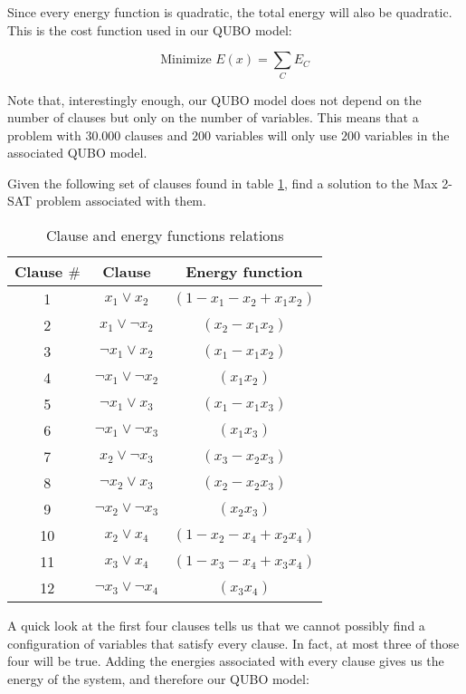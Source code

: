 Since every energy function is quadratic, the total energy will also be quadratic. This is the cost function used in our QUBO model:

$$ \text{Minimize } E(x) = \sum_C E_C$$

Note that, interestingly enough, our QUBO model does not depend on the number of clauses but only on the number of variables. This means that a problem with $30.000$ clauses and $200$ variables will only use $200$ variables in the associated QUBO model.




Given the following set of clauses found in table \ref{tab:penalties-max-2-sat-example}, find a solution to the Max 2-SAT problem associated with them.

\begin{table}[h]
	\centering
	\begin{tabular}{ccc}
		Clause $\#$	& Clause						& Energy function				\\  		\hline
		1       	& $x_1 \vee x_2$    			& $(1 - x_1 - x_2 + x_1x_2)$	\\
		2       	& $x_1 \vee \neg x_2$    		& $(x_2 - x_1x_2)$				\\
		3       	& $\neg x_1 \vee x_2$    		& $(x_1 - x_1x_2)$				\\
		4       	& $\neg x_1 \vee \neg x_2$    	& $(x_1x_2)$					\\
		5       	& $\neg x_1 \vee x_3$    		& $(x_1 - x_1x_3)$				\\
		6		  	& $\neg x_1 \vee \neg x_3$    	& $(x_1x_3)$					\\
		7       	& $x_2 \vee \neg x_3$    		& $(x_3 - x_2x_3)$				\\
		8       	& $\neg x_2 \vee x_3$    		& $(x_2 - x_2x_3)$				\\
		9       	& $\neg x_2 \vee \neg x_3$    	& $(x_2x_3)$					\\
		10       	& $x_2 \vee x_4$    			& $(1 - x_2 - x_4 + x_2x_4)$	\\
		11       	& $x_3 \vee x_4$    			& $(1 - x_3 - x_4 + x_3x_4)$	\\
		12       	& $\neg x_3 \vee \neg x_4$    	& $(x_3x_4)$					
	\end{tabular}
	\caption{Clause and energy functions relations}
	\label{tab:penalties-max-2-sat-example}
\end{table}

A quick look at the first four clauses tells us that we cannot possibly find a configuration of variables that satisfy every clause. In fact, at most three of those four will be true. Adding the energies associated with every clause gives us the energy of the system, and therefore our QUBO model:

